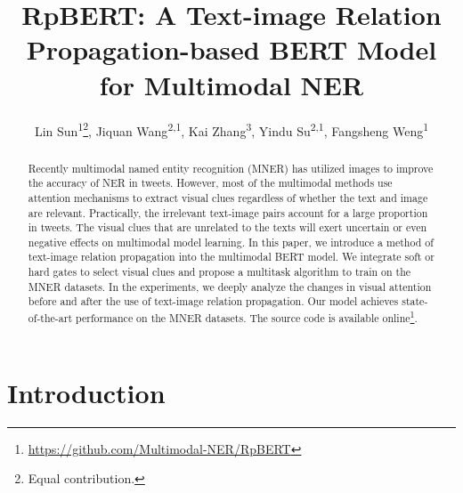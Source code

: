 \documentclass[letterpaper]{article} \usepackage{aaai21}  \usepackage{times}  \usepackage{helvet} \usepackage{courier}  \usepackage[hyphens]{url}  \usepackage{graphicx} \urlstyle{rm} \def\UrlFont{\rm}  \usepackage{natbib}  \usepackage{caption} \frenchspacing  \setlength{\pdfpagewidth}{8.5in}  \setlength{\pdfpageheight}{11in}
\title{RpBERT: A Text-image Relation Propagation-based BERT Model for Multimodal NER}
\author {
Lin Sun\textsuperscript{\rm 1}\thanks{Equal contribution.},
 Jiquan Wang\textsuperscript{\rm 2,\rm 1}\printfnsymbol{1},
 Kai Zhang\textsuperscript{\rm 3},
Yindu Su\textsuperscript{\rm 2,\rm 1},
 Fangsheng Weng\textsuperscript{\rm 1}
\\
}
\begin{document}
 


\maketitle


\begin{abstract}
Recently multimodal named entity recognition (MNER) has utilized images to improve the accuracy of NER in tweets.
However, most of the multimodal methods use attention mechanisms to extract visual clues regardless of whether the text and image are relevant.
Practically, the irrelevant text-image pairs account for a large proportion in tweets.
The visual clues that are unrelated to the texts will exert uncertain or even negative effects on multimodal model learning.
In this paper, we introduce a method of text-image relation propagation into the multimodal BERT model.
We integrate soft or hard gates to select visual clues and propose a multitask algorithm to train on the MNER datasets.
In the experiments, we deeply analyze the changes in visual attention before and after the use of text-image relation propagation.
Our model achieves state-of-the-art performance on the MNER datasets.
The source code is available online\footnote{\url{https://github.com/Multimodal-NER/RpBERT}}.


\end{abstract}



\section{Introduction}
\end{document}
